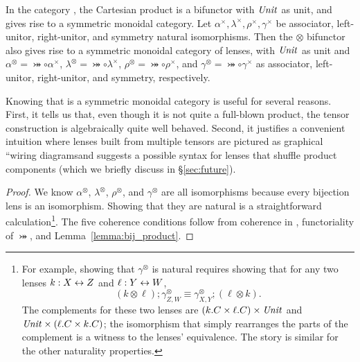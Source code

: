 \begin{defn}[$R$-similarity]
\begin{theorem}
\begin{lemma}
\begin{theorem}[No products]
\begin{prop}
In the category \SET, the Cartesian product is a bifunctor with $\mathit{Unit}$ as
unit, and gives rise to a symmetric monoidal category. Let
$\alpha^\times,\lambda^\times,\rho^\times,\gamma^\times$ be associator,
left-unitor, right-unitor, and symmetry natural isomorphisms. Then the
$\otimes$ bifunctor also gives rise to a symmetric monoidal category of
lenses, with $\mathit{Unit}$ as unit and $\alpha^\otimes=\bij\circ\alpha^\times$,
$\lambda^\otimes=\bij\circ\lambda^\times$,
$\rho^\otimes=\bij\circ\rho^\times$, and
$\gamma^\otimes=\bij\circ\gamma^\times$ as associator, left-unitor,
right-unitor, and symmetry, respectively.
\end{prop}

Knowing that \LENS{} is a symmetric monoidal category is useful for several
reasons.  First, it tells us that, even though it is not quite a full-blown
product, the tensor construction is algebraically quite well behaved.
Second, it justifies a convenient intuition where lenses built from multiple
tensors are pictured as graphical ``wiring diagrams\commaquote and suggests a
possible syntax for lenses that shuffle product components (which we briefly
discuss in \S\ref{sec:future}).

\iflater{}\fi

\iffull
\begin{proof}
We know $\alpha^\otimes$, $\lambda^\otimes$, $\rho^\otimes$, and
$\gamma^\otimes$ are all isomorphisms because every bijection lens is an
isomorphism. Showing that they are natural is a straightforward
calculation\footnote{For example, showing that $\gamma^\otimes$ is natural
requires showing that for any two lenses $k : X \leftrightarrow Z$ and $\ell : Y \leftrightarrow
W$,
\[(k \otimes \ell);\gamma^\otimes_{Z,W} \equiv \gamma^\otimes_{X,Y};(\ell
\otimes k).\]
The complements for these two lenses are $(k.C \times \ell.C) \times \mathit{Unit}$
and $\mathit{Unit} \times (\ell.C \times k.C)$; the isomorphism that simply
rearranges the parts of the complement is a witness to the lenses'
equivalence.  The story is similar for the other naturality properties.}.
The five coherence conditions follow from coherence in \SET, functoriality of
$\bij$, and Lemma~\ref{lemma:bij_product}.
\end{proof}
\fi


\end{theorem}
\end{lemma}
\end{theorem}
\end{defn}
